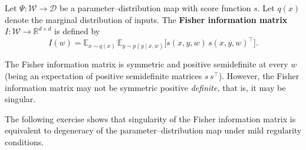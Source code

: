 \documentclass[11pt]{article}
\newcommand{\R}{\mathbb{R}}
\newcommand{\E}{\mathbb{E}}
\newcommand{\W}{\mathcal{W}}
\newcommand{\D}{\mathcal{D}}
\begin{document}
\begin{definition}
\label{def:fim}
    Let $\Psi : \W \to \D$ be a parameter--distribution map with score
    function $s$.
    Let $q(x)$ denote the marginal distribution of inputs.
    The \textbf{Fisher information matrix}
        $I : \W \to \R^{d \times d}$
    is defined by
    \begin{equation}\label{eq:fim}
        I(w) = \E_{x \sim q(x)}\,
            \E_{y \sim p(y \mid x, w)}\!\bigl[
                s(x,y,w)\, s(x,y,w)^\top
            \bigr].
    \end{equation}
\end{definition}

The Fisher information matrix is symmetric and positive semidefinite at
every $w$ (being an expectation of positive semidefinite matrices
$s\, s^\top$).
However, the Fisher information matrix may not be symmetric positive \emph{definite,} that is, it may be singular.

The following exercise shows that singularity of the Fisher information matrix is equivalent to degeneracy of the parameter--distribution map under mild regularity conditions.
\end{document}
